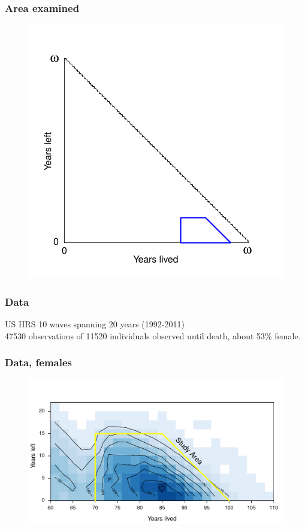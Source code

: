 \documentclass{beamer}
\begin{document}
\begin{frame}
\frametitle{Area examined}
\vspace{-1cm}
\begin{figure}
\includegraphics[scale=.7]{Figures/Triangle3}
\end{figure}
\end{frame}



\begin{frame}
\frametitle{Data}
\begin{block}{US HRS}
10 waves spanning 20 years (1992-2011)\\
47530 observations of 11520 individuals observed until death, about 53\% female.
\end{block}
\end{frame}


\begin{frame}
\frametitle{Data, females}
\begin{figure}
\includegraphics[width=\linewidth]{Figures/CaseCountFemales}
\end{figure}
\end{frame}
\end{document}
